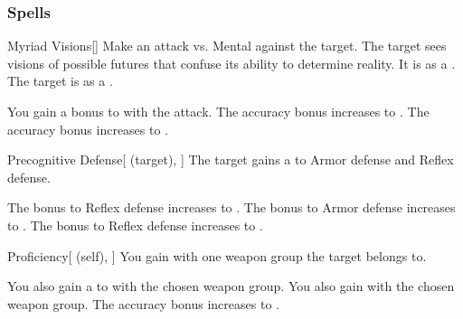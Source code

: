 \subsubsection{Spells}


\lowercase{\hypertarget{spell:Myriad Visions}{}}\label{spell:Myriad Visions}
\begin{freeability}[Rank 1]{\hypertarget{spell:Myriad Visions}{Myriad Visions}}[]
Make an attack vs. Mental against the target.
\hit The target sees visions of possible futures that confuse its ability to determine reality.
It is  as a .
\crit The target is  as a .

\rankline
{} You gain a  bonus to  with the attack.
 The accuracy bonus increases to .
 The accuracy bonus increases to .
\end{freeability}
\vspace{0.25em}



\lowercase{\hypertarget{spell:Precognitive Defense}{}}\label{spell:Precognitive Defense}
\begin{attuneability}[Rank 1]{\hypertarget{spell:Precognitive Defense}{Precognitive Defense}}[ (target), ]
The target gains a   to Armor defense and Reflex defense.

\rankline
{} The bonus to Reflex defense increases to .
 The bonus to Armor defense increases to .
 The bonus to Reflex defense increases to .
\end{attuneability}
\vspace{0.25em}



\lowercase{\hypertarget{spell:Proficiency}{}}\label{spell:Proficiency}
\begin{attuneability}[Rank 1]{\hypertarget{spell:Proficiency}{Proficiency}}[ (self), ]
You gain  with one weapon group the target belongs to.

\rankline
{} You also gain a   to  with the chosen weapon group.
 You also gain  with the chosen weapon group.
 The accuracy bonus increases to .
\end{attuneability}
\vspace{0.25em}



